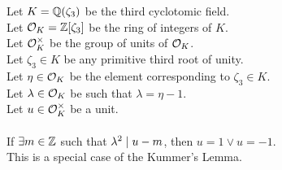 \begin{theorem}
    \label{lmm:eq_one_or_neg_one_of_unit_of_congruent}
    \leanok
    Let $K = \mathbb{Q}(\zeta_3)$ be the third cyclotomic field. \\
    Let $\mathcal{O}_K = \mathbb{Z}[\zeta_3]$ be the ring of integers of $K$. \\
    Let $\mathcal{O}^\times_K$ be the group of units of $\mathcal{O}_K$. \\
    Let $\zeta_3 \in K$ be any primitive third root of unity. \\
    Let $\eta \in \mathcal{O}_K$ be the element corresponding to $\zeta_3 \in K$. \\
    Let $\lambda \in \mathcal{O}_K$ be such that $\lambda = \eta -1$. \\
    Let $u \in \mathcal{O}^\times_K$ be a unit. \\\\
    If $\exists m \in \mathbb{Z}$ such that $\lambda^2 \mid u - m$, then
    $u = 1 \lor u = -1$. \\
    This is a special case of the Kummer's Lemma.
\end{theorem}
